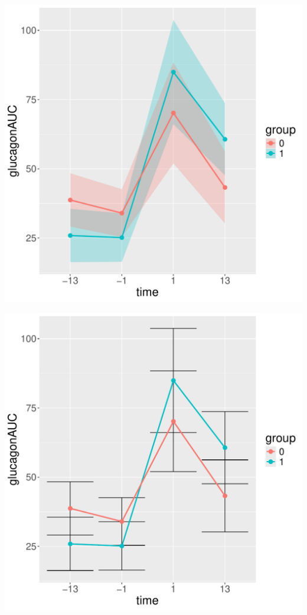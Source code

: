 \documentclass[12pt]{article}
\begin{document}
\begin{minipage}{0.3\linewidth}
\begin{center}
\includegraphics[width=\textwidth]{./figures/fit-autoplot.pdf}
\end{center}
\end{minipage}
\begin{minipage}{0.3\linewidth}
\begin{center}
\includegraphics[width=\textwidth]{./figures/fit-autoplot2.pdf}
\end{center}
\end{minipage}
\end{document}
